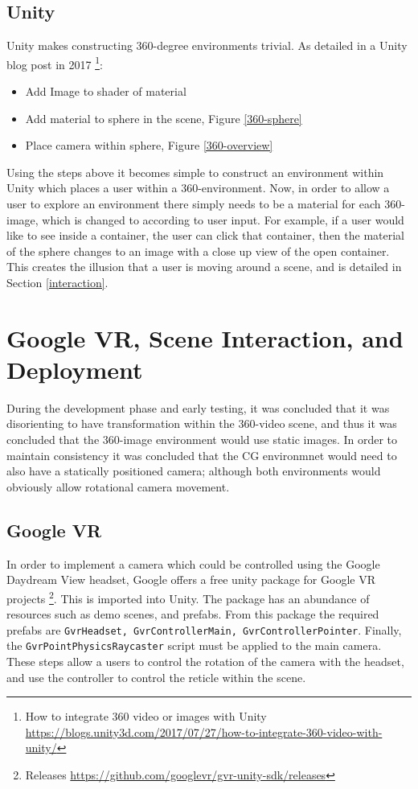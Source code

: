 \documentclass[ %
                    author={Elis Jones},
                supervisor={Dr. Kirsten Cater},
                    degree={BSc},
                     title={The Effect of Presentation Medium on Spatial Cognition},
                  subtitle={in the Virtual Environment},
                      year={2018} ]{dissertation}
\begin{document}
\subsection{Unity}
Unity makes constructing 360-degree environments trivial. As detailed in a Unity blog post in 2017 \footnote{How to integrate 360 video or images with Unity \url{https://blogs.unity3d.com/2017/07/27/how-to-integrate-360-video-with-unity/}}: 

\begin{itemize}
\item Add Image to shader of material
\item Add material to sphere in the scene, Figure \ref{360-sphere}
\item Place camera within sphere, Figure \ref{360-overview}
\end{itemize}

Using the steps above it becomes simple to construct an environment within Unity which places a user within a 360-environment. Now, in order to allow a user to explore an environment there simply needs to be a material for each 360-image, which is changed to according to user input. For example, if a user would like to see inside a container, the user can click that container, then the material of the sphere changes to an image with a close up view of the open container. This creates the illusion that a user is moving around a scene, and is detailed in Section \ref{interaction}. 

\section{Google VR, Scene Interaction, and Deployment}
During the development phase and early testing, it was concluded that it was disorienting to have transformation within the 360-video scene, and thus it was concluded that the 360-image environment would use static images. In order to maintain consistency it was concluded that the CG environmnet would need to also have a statically positioned camera; although both environments would obviously allow rotational camera movement.  

\subsection{Google VR}\label{googlevr}

In order to implement a camera which could be controlled using the Google Daydream View headset, Google offers a free unity package for Google VR projects \footnote{Releases \url{https://github.com/googlevr/gvr-unity-sdk/releases}}. This is imported into Unity. The package has an abundance of resources such as demo scenes, and prefabs. From this package the required prefabs are \lstinline{GvrHeadset, GvrControllerMain, GvrControllerPointer}. Finally, the \lstinline{GvrPointPhysicsRaycaster} script must be applied to the main camera. These steps allow a users to control the rotation of the camera with the headset, and use the controller to control the reticle within the scene. 
\end{document}
